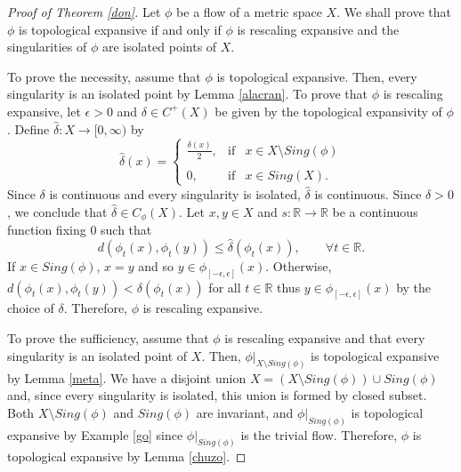 \documentclass[11pt,letterpaper]{amsart}
\begin{document}
\begin{proof}[Proof of Theorem \ref{don}]
Let $\phi$ be a flow of a metric space $X$.
We shall prove that $\phi$ is topological expansive if and only if $\phi$ is rescaling expansive and the singularities of $\phi$ are isolated points of $X$.

To prove the necessity, assume that $\phi$ is topological expansive.
Then, every singularity is an isolated point by Lemma \ref{alacran}.
To prove that $\phi$ is rescaling expansive,
let $\epsilon>0$ and $\delta\in C^+(X)$ be given by the topological expansivity of $\phi$.
Define $\hat{\delta}:X\to [0,\infty)$ by
$$
\hat{\delta}(x) = \left\{
\begin{array}{rcl}
\frac{\delta(x)}2, & \mbox{if} & x\in X\setminus Sing(\phi)\\
& & \\
0,& \mbox{if} & x\in Sing(X).
\end{array}
\right.
$$
Since $\delta$ is continuous and every singularity is isolated, $\hat{\delta}$ is continuous. Since $\delta>0$, we conclude that $\hat{\delta}\in C_\phi(X)$.
Let $x,y\in X$ and $s:\mathbb{R}\to\mathbb{R}$ be a continuous function fixing $0$ such that
$$
d(\phi_t(x),\phi_t(y))\leq \hat{\delta}(\phi_t(x)),\quad\quad\forall t\in \mathbb{R}.
$$
If $x\in Sing(\phi)$, $x=y$ and so $y\in \phi_{[-\epsilon,\epsilon]}(x)$.
Otherwise, $d(\phi_t(x),\phi_t(y))<\delta(\phi_t(x))$ for all $t\in \mathbb{R}$ thus
$y\in\phi_{[-\epsilon,\epsilon]}(x)$ by the choice of $\delta$.
Therefore, $\phi$ is rescaling expansive.


To prove the sufficiency, assume that $\phi$ is rescaling expansive and that every singularity is an isolated point of $X$.
Then, $\phi|_{X\setminus Sing(\phi)}$ is topological expansive by Lemma \ref{meta}. We have a disjoint union $X=(X\setminus Sing(\phi))\cup Sing(\phi)$ and, since every singularity is isolated, this union is formed by closed subset. Both $X\setminus Sing(\phi)$ and $Sing(\phi)$ are invariant,
and $\phi|_{Sing(\phi)}$ is topological expansive by Example \ref{go} since
$\phi|_{Sing(\phi)}$ is the trivial flow.
Therefore, $\phi$ is topological expansive by Lemma \ref{chuzo}.
\end{proof}
\end{document}
